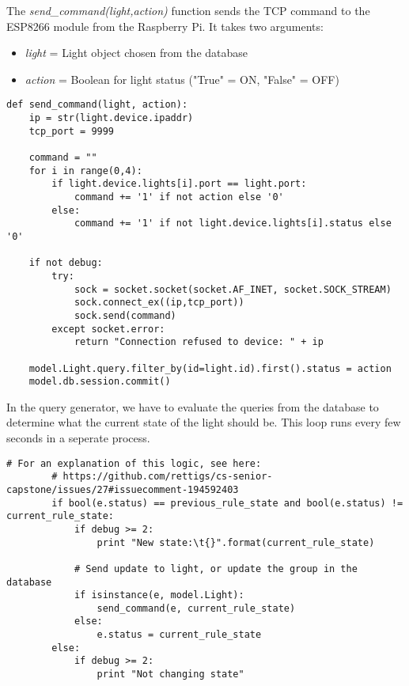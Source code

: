 The \textit{send\_command(light,action)} function sends the TCP command to the ESP8266 module from the Raspberry Pi. It takes two arguments:
\begin{itemize}
\item \textit{light} = Light object chosen from the database
\item \textit{action} = Boolean for light status ("True" = ON, "False" = OFF)
\end{itemize}
\begin{lstlisting}
def send_command(light, action):
    ip = str(light.device.ipaddr)
    tcp_port = 9999

    command = ""
    for i in range(0,4):
        if light.device.lights[i].port == light.port:
            command += '1' if not action else '0'
        else:
            command += '1' if not light.device.lights[i].status else '0'

    if not debug:
        try:
            sock = socket.socket(socket.AF_INET, socket.SOCK_STREAM)
            sock.connect_ex((ip,tcp_port))
            sock.send(command)
        except socket.error:
            return "Connection refused to device: " + ip

    model.Light.query.filter_by(id=light.id).first().status = action
    model.db.session.commit()
\end{lstlisting}

In the query generator, we have to evaluate the queries from the database to determine what the current state of the light should be. This loop runs every few seconds in a seperate process.

\begin{lstlisting}
# For an explanation of this logic, see here:
        # https://github.com/rettigs/cs-senior-capstone/issues/27#issuecomment-194592403
        if bool(e.status) == previous_rule_state and bool(e.status) != current_rule_state:
            if debug >= 2:
                print "New state:\t{}".format(current_rule_state)

            # Send update to light, or update the group in the database
            if isinstance(e, model.Light):
                send_command(e, current_rule_state)
            else:
                e.status = current_rule_state
        else:
            if debug >= 2:
                print "Not changing state"
\end{lstlisting}
